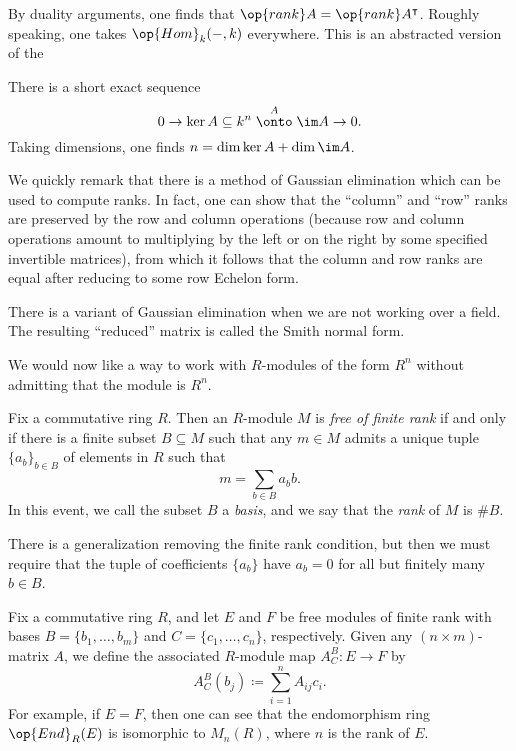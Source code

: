 \documentclass[../notes.tex]{subfiles}
\begin{document}
\begin{remark}
	By duality arguments, one finds that $\op{rank}A=\op{rank}A^\intercal$. Roughly speaking, one takes $\op{Hom}_k(-,k)$ everywhere. This is an abstracted version of the 
\end{remark}
\begin{remark}
	There is a short exact sequence
	\[0\to\ker A\subseteq k^n\stackrel A\onto\im A\to0.\]
	Taking dimensions, one finds $n=\dim\ker A+\dim\im A$.
\end{remark}
\begin{remark}
	We quickly remark that there is a method of Gaussian elimination which can be used to compute ranks. In fact, one can show that the ``column'' and ``row'' ranks are preserved by the row and column operations (because row and column operations amount to multiplying by the left or on the right by some specified invertible matrices), from which it follows that the column and row ranks are equal after reducing to some row Echelon form.
\end{remark}
\begin{remark}
	There is a variant of Gaussian elimination when we are not working over a field. The resulting ``reduced'' matrix is called the Smith normal form.
\end{remark}
We would now like a way to work with $R$-modules of the form $R^n$ without admitting that the module is $R^n$.
\begin{definition}[free]
	Fix a commutative ring $R$. Then an $R$-module $M$ is \textit{free of finite rank} if and only if there is a finite subset $B\subseteq M$ such that any $m\in M$ admits a unique tuple $\{a_b\}_{b\in B}$ of elements in $R$ such that
	\[m=\sum_{b\in B}a_bb.\]
	In this event, we call the subset $B$ a \textit{basis}, and we say that the \textit{rank} of $M$ is $\#B$.
\end{definition}
\begin{remark}
	There is a generalization removing the finite rank condition, but then we must require that the tuple of coefficients $\{a_b\}$ have $a_b=0$ for all but finitely many $b\in B$.
\end{remark}
\begin{notation}
	Fix a commutative ring $R$, and let $E$ and $F$ be free modules of finite rank with bases $B=\{b_1,\ldots,b_m\}$ and $C=\{c_1,\ldots,c_n\}$, respectively. Given any $(n\times m)$-matrix $A$, we define the associated $R$-module map $A^B_C\colon E\to F$ by
	\[A^B_C(b_j)\coloneqq\sum_{i=1}^nA_{ij}c_i.\]
	For example, if $E=F$, then one can see that the endomorphism ring $\op{End}_R(E)$ is isomorphic to $M_n(R)$, where $n$ is the rank of $E$.
\end{notation}
\end{document}
